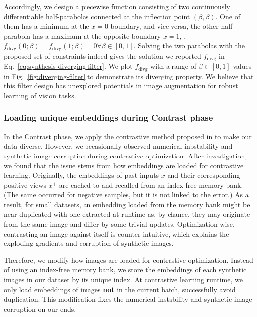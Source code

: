 \begin{foldable} %
    Accordingly, we design a piecewise function consisting of two continuously differentiable half-parabolas connected at the inflection point $\left(\beta,\beta\right)$.
    One of them has a minimum at the $x=0$ boundary, and vice versa, the other half-parabola has a maximum at the opposite boundary $x=1$, \ie, $f_{\text{divg}}^{\prime}(0;\beta)=f_{\text{divg}}^{\prime}(1;\beta)=0 \forall \beta\in[0, 1]$.
    Solving the two parabolas with the proposed set of constraints indeed gives the solution  we reported $f_{\text{divg}}$ in Eq.~\ref{eq:synthesis-diverging-filter}.
    We plot $f_{\text{divg}}$ with a range of $\beta \in [0, 1]$ values in Fig.~\ref{fig:diverging-filter} to demonstrate its diverging property.
    We believe that this filter design has unexplored potentials in image augmentation for robust learning of vision tasks.
\end{foldable}



\subsubsection{Loading unique embeddings during Contrast phase} \label{sssec:app01-teacherstudents-optimization-uniqueembeddings}
\begin{foldable} %
    In the Contrast phase, we apply the contrastive method proposed in \citet{fang2021contrastive} to make our data diverse.
    However, we occasionally observed numerical inbstability and synthetic image corruption during contrastive optimization.
    After investigation, we found that the issue stems from how embeddings are loaded for contrastive learning.
    Originally, the embeddings of past inputs $x$ and their corresponding positive views $x^{+}$ are cached to and recalled from an index-free memory bank.
    (The same occurred for negative samples, but it is not linked to the error.)
    As a result, for small datasets, an embedding loaded from the memory bank might be near-duplicated with one extracted at runtime as, by chance, they may originate from the same image and differ by some trivial updates.
    Optimization-wise, contrasting an image against itself is counter-intuitive, which explains the exploding gradients and corruption of synthetic images.
\end{foldable}

\begin{foldable} %
    Therefore, we modify how images are loaded for contrastive optimization.
    Instead of using an index-free memory bank, we store the embeddings of each synthetic images in our dataset by its unique index.
    At contrastive learning runtime, we only load embeddings of images \textbf{not} in the current batch, successfully avoid duplication.
    This modification fixes the numerical instability and synthetic image corruption on our ends.
\end{foldable}


